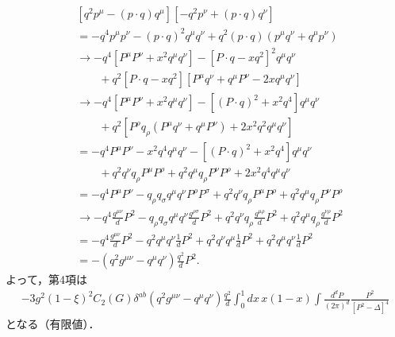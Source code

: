 \begin{align*}
  & [q^2 p^\mu - (p\cdot q) q^\mu][-q^2 p^\nu + (p\cdot q) q^\nu] \\
  & = - q^4 p^\mu p^\nu - (p\cdot q)^2 q^\mu q^\nu + q^2 (p\cdot q) (p^\mu q^\nu + q^\mu p^\nu) \\
  &\to -q^4 \left[ P^\mu P^\nu + x^2 q^\mu q^\nu \right]
  - \left[ P \cdot q - xq^2 \right]^2 q^\mu q^\nu \\
  & \qquad + q^2 [ P \cdot q - xq^2 ] [P^\mu q^\nu + q^\mu P^\nu - 2xq^\mu q^\nu] \\
  &\to -q^4 \left[ P^\mu P^\nu + x^2 q^\mu q^\nu \right]
  - \left[ (P \cdot q)^2 + x^2 q^4 \right] q^\mu q^\nu \\
  & \qquad + q^2 \left[ P^\rho q_\rho (P^\mu q^\nu + q^\mu P^\nu) + 2x^2 q^2 q^\mu q^\nu \right] \\
  &= -q^4 P^\mu P^\nu - x^2 q^4 q^\mu q^\nu
  - \left[ (P \cdot q)^2 + x^2 q^4 \right] q^\mu q^\nu \\
  & \qquad + q^2 q^\nu q_\rho P^\mu P^\rho + q^2 q^\mu q_\rho P^\nu P^\rho + 2x^2 q^4 q^\mu q^\nu  \\
  &= -q^4 P^\mu P^\nu
  - q_\rho q_\sigma q^\mu q^\nu P^\rho P^\sigma
  + q^2 q^\nu q_\rho P^\mu P^\rho + q^2 q^\mu q_\rho P^\nu P^\rho \\
  &\to -q^4 \frac{g^{\mu\nu}}{d} P^2
  - q_\rho q_\sigma q^\mu q^\nu \frac{g^{\rho\sigma}}{d} P^2
  + q^2 q^\nu q_\rho \frac{g^{\mu\rho}}{d} P^2
  + q^2 q^\mu q_\rho \frac{g^{\nu\rho}}{d} P^2 \\
  &= -q^4 \frac{g^{\mu\nu}}{d} P^2
  - q^2 q^\mu q^\nu \frac{1}{d} P^2
  + q^2 q^\nu q^\mu \frac{1}{d} P^2
  + q^2 q^\mu q^\nu \frac{1}{d} P^2 \\
  &= - (q^2 g^{\mu\nu} - q^\mu q^\nu) \frac{q^2}{d} P^2 .
\end{align*}
よって，第4項は
\begin{align}
   - 3 g^2 (1-\xi)^2 C_2(G) \delta^{ab} (q^2 g^{\mu\nu} - q^\mu q^\nu) \frac{q^2}{d} \int_0^1 dx \, x(1-x)
  \int \frac{d^dP}{(2\pi)^d} \frac{P^2}{[P^2 - \Delta]^4}
\end{align}
となる（有限値）．

